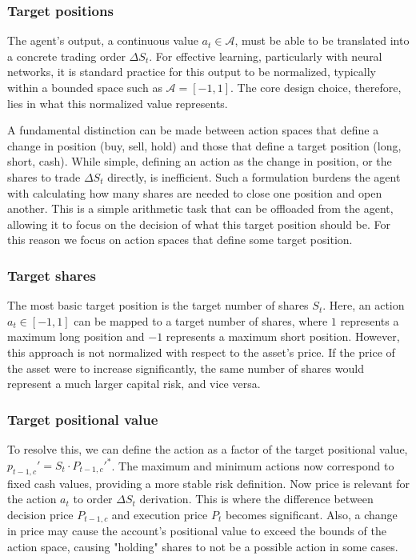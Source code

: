\subsubsection{Target positions}

The agent's output, a continuous value $a_t \in \mathcal{A}$, must be able to be translated into a concrete trading order $\Delta S_t$. For effective learning, particularly with neural networks, it is standard practice for this output to be normalized, typically within a bounded space such as $\mathcal{A}=[-1,1]$. The core design choice, therefore, lies in what this normalized value represents.

A fundamental distinction can be made between action spaces that define a change in position (buy, sell, hold) and those that define a target position (long, short, cash). While simple, defining an action as the change in position, or the shares to trade $\Delta S_t$ directly, is inefficient. Such a formulation burdens the agent with calculating how many shares are needed to close one position and open another. This is a simple arithmetic task that can be offloaded from the agent, allowing it to focus on the decision of what this target position should be. For this reason we focus on action spaces that define some target position.

\subsubsection{Target shares}

The most basic target position is the target number of shares $S_t$. Here, an action $a_t \in [-1, 1]$ can be mapped to a target number of shares, where $1$ represents a maximum long position and $-1$ represents a maximum short position. However, this approach is not normalized with respect to the asset's price. If the price of the asset were to increase significantly, the same number of shares would represent a much larger capital risk, and vice versa.

\subsubsection{Target positional value}

To resolve this, we can define the action as a factor of the target positional value, $p_{t-1,c}'=S_t \cdot P_{t-1,c}'^*$. The maximum and minimum actions now correspond to fixed cash values, providing a more stable risk definition. Now price is relevant for the action $a_t$ to order $\Delta S_t$ derivation. This is where the difference between decision price $P_{t-1,c}$ and execution price $P_t$ becomes significant. Also, a change in price may cause the account's positional value to exceed the bounds of the action space, causing "holding" shares to not be a possible action in some cases. 

